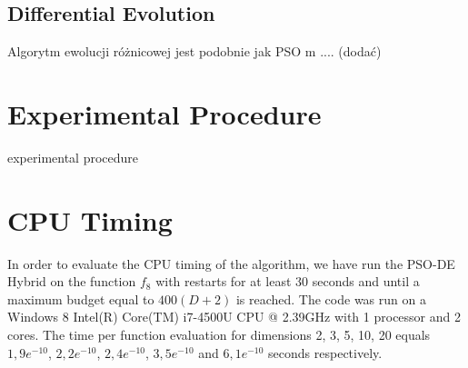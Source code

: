 \documentclass{article}
\begin{document}
\subsection{Differential Evolution}
Algorytm ewolucji różnicowej jest podobnie jak PSO m .... (dodać)

 \section{Experimental Procedure}
experimental procedure
 \section{CPU Timing}
In order to evaluate the CPU timing of the algorithm, we have run the {PSO-DE Hybrid} on the function $f_{8}$ with restarts for at least 30 seconds and until a maximum budget equal to {$400 (D + 2)$} is reached. The code was run on a {Windows 8 Intel(R) Core(TM) i7-4500U CPU @ 2.39GHz} with {1} processor and {2} cores. The time per function evaluation for dimensions 2, 3, 5, 10, 20 equals $1,9e^{-10}$, $2,2e^{-10}$, $2,4e^{-10}$, $3,5e^{-10}$ and $6,1e^{-10}$ seconds respectively. 

\end{document}
